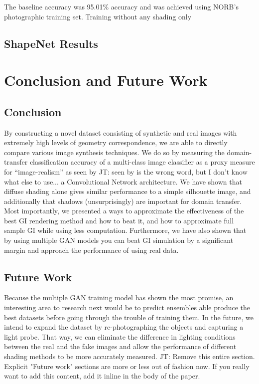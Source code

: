 \documentclass[10pt,twocolumn,letterpaper]{article}
\newcommand{\tompson}[1]{{\color{green} JT: #1}}
\begin{document}
The baseline accuracy was 95.01\% accuracy and was achieved using NORB's photographic training set. Training without any shading only 
\subsection{ShapeNet Results}

\section{Conclusion and Future Work}
\subsection{Conclusion}

By constructing a novel dataset consisting of synthetic and real images with extremely high levels of geometry correspondence, we are able to directly compare various image synthesis techniques. We do so by measuring the domain-transfer classification accuracy of a multi-class image classifier as a proxy measure for ``image-realism'' as seen by \tompson{seen by is the wrong word, but I don't know what else to use...} a Convolutional Network architecture.  We have shown that diffuse shading alone gives similar performance to a simple silhouette image, and additionally that shadows (unsurprisingly) are important for domain transfer.  Most importantly, we presented a  ways to approximate the effectiveness of the best GI rendering method and how to beat it,  and how to approximate full sample GI while using less computation. Furthermore, we have also shown that by using multiple GAN models you can beat GI simulation by a significant margin and approach the performance of using real data. 

\subsection{Future Work}

Because the multiple GAN training model has shown the most promise, an interesting area to research next would be to predict ensembles able produce the best datasets before going through the trouble of training them.
In the future, we intend to expand the dataset by re-photographing the objects and capturing a light probe.  That way, we can eliminate the difference in lighting conditions between the real and the fake images and allow the performance of different shading methods to be more accurately measured.
\tompson{Remove this entire section. Explicit "Future work" sections are more or less out of fashion now. If you really want to add this content, add it inline in the body of the paper.}
\end{document}
